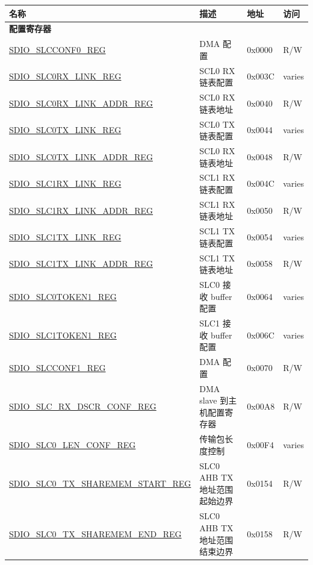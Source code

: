 \begin{longtable}{ | p{7.1cm} | p{6.1cm} | p{1.2cm} | p{1cm} | }
\hline\rowcolor{lightgray}
名称 & 描述 & 地址 & 访问 \\ \hline
\endhead
\multicolumn{4}{|l|}{\textbf{配置寄存器}} \\ \hline
\hyperref[regdesc:SDIOSLCCONF0REG]{SDIO\_SLCCONF0\_REG} & DMA 配置 & 0x0000 & R/W \\ \hline
\hyperref[regdesc:SDIOSLC0RXLINKREG]{SDIO\_SLC0RX\_LINK\_REG} & SCL0 RX 链表配置 & 0x003C & varies \\ \hline
\hyperref[regdesc:SDIOSLC0RXLINKADDRREG]{SDIO\_SLC0RX\_LINK\_ADDR\_REG} & SCL0 RX 链表地址 & 0x0040 & R/W \\ \hline
\hyperref[regdesc:SDIOSLC0TXLINKREG]{SDIO\_SLC0TX\_LINK\_REG} & SCL0 TX 链表配置 & 0x0044 & varies \\ \hline
\hyperref[regdesc:SDIOSLC0TXLINKADDRREG]{SDIO\_SLC0TX\_LINK\_ADDR\_REG} & SCL0 RX 链表地址 & 0x0048 & R/W \\ \hline
\hyperref[regdesc:SDIOSLC1RXLINKREG]{SDIO\_SLC1RX\_LINK\_REG} & SCL1 RX 链表配置 & 0x004C & varies \\ \hline
\hyperref[regdesc:SDIOSLC1RXLINKADDRREG]{SDIO\_SLC1RX\_LINK\_ADDR\_REG} & SCL1 RX 链表地址 & 0x0050 & R/W \\ \hline
\hyperref[regdesc:SDIOSLC1TXLINKREG]{SDIO\_SLC1TX\_LINK\_REG} & SCL1 TX 链表配置 & 0x0054 & varies \\ \hline
\hyperref[regdesc:SDIOSLC1TXLINKADDRREG]{SDIO\_SLC1TX\_LINK\_ADDR\_REG} & SCL1 TX 链表地址 & 0x0058 & R/W \\ \hline
\hyperref[regdesc:SDIOSLC0TOKEN1REG]{SDIO\_SLC0TOKEN1\_REG} & SLC0 接收 buffer 配置 & 0x0064 & varies \\ \hline
\hyperref[regdesc:SDIOSLC1TOKEN1REG]{SDIO\_SLC1TOKEN1\_REG} & SLC1 接收 buffer 配置 & 0x006C & varies \\ \hline
\hyperref[regdesc:SDIOSLCCONF1REG]{SDIO\_SLCCONF1\_REG} & DMA 配置 & 0x0070 & R/W \\ \hline
\hyperref[regdesc:SDIOSLCRXDSCRCONFREG]{SDIO\_SLC\_RX\_DSCR\_CONF\_REG} & DMA slave 到主机配置寄存器 & 0x00A8 & R/W \\ \hline
\hyperref[regdesc:SDIOSLC0LENCONFREG]{SDIO\_SLC0\_LEN\_CONF\_REG} & 传输包长度控制 & 0x00F4 & varies \\ \hline
\hyperref[regdesc:SDIOSLC0TXSHAREMEMSTARTREG]{SDIO\_SLC0\_TX\_SHAREMEM\_START\_REG} & SLC0 AHB TX 地址范围起始边界 & 0x0154 & R/W \\ \hline
\hyperref[regdesc:SDIOSLC0TXSHAREMEMENDREG]{SDIO\_SLC0\_TX\_SHAREMEM\_END\_REG} & SLC0 AHB TX 地址范围结束边界 & 0x0158 & R/W \\ \hline

\end{longtable}
